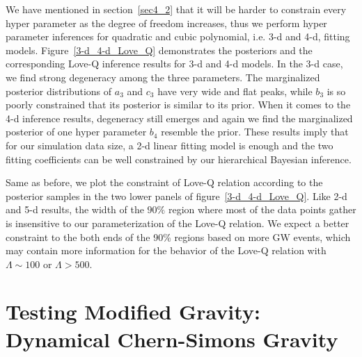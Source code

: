 \documentclass[a4paper,11pt]{article}
\begin{document}
We have mentioned in section~\ref{sec4_2} that it will be harder to constrain every hyper parameter as the 
degree of freedom increases, thus we perform hyper parameter inferences for quadratic and cubic polynomial, 
i.e. 3-d and 4-d, fitting models. Figure~\ref{3-d_4-d_Love_Q} demonstrates the posteriors and the corresponding 
Love-Q inference results for 3-d and 4-d models. In the 3-d case, we find strong degeneracy among the three parameters. 
The marginalized posterior distributions of $a_3$ and $c_3$ have very wide and flat peaks, while $b_3$ is so poorly 
constrained that its posterior is similar to its prior. When it comes to the 4-d inference results, degeneracy still 
emerges and again we find the marginalized posterior of one hyper parameter $b_4$ resemble the prior. These results 
imply that for our simulation data size, a 2-d linear fitting model is enough and the two fitting coefficients can be 
well constrained by our hierarchical Bayesian inference.

Same as before, we plot the constraint of Love-Q relation according to the posterior samples in the two lower panels 
of figure~\ref{3-d_4-d_Love_Q}. Like 2-d and 5-d results, the width of the $90\%$ region where most of the data points 
gather is insensitive to our parameterization of the Love-Q relation. We expect a better constraint to the both ends of 
the 90\% regions based on more GW events, which may contain more information for the behavior of the Love-Q relation 
with $\Lambda \sim 100$ or $\Lambda > 500$.

\section{Testing Modified Gravity: Dynamical Chern-Simons Gravity}
\label{sec5}
\end{document}

